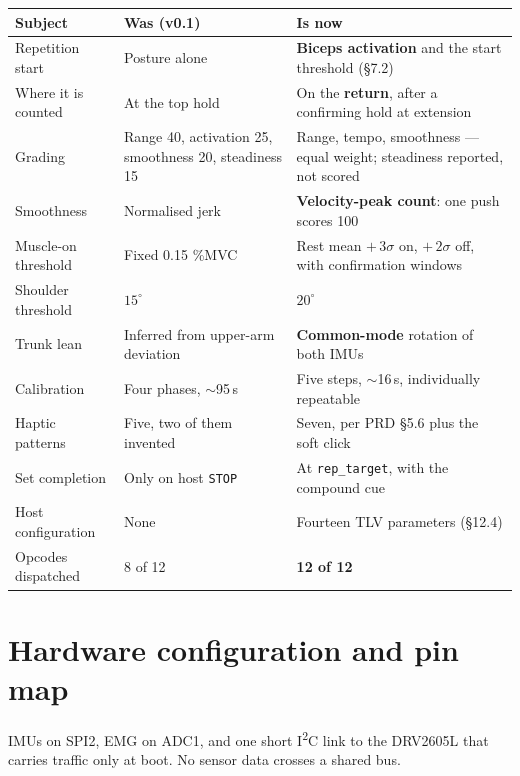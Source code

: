 \documentclass[11pt]{article}
\begin{document}
\begin{table}[H]
\centering\small
\begin{tabularx}{\linewidth}{@{}p{30mm} p{40mm} X@{}}
\toprule
\textbf{Subject} & \textbf{Was (v0.1)} & \textbf{Is now} \\
\midrule
Repetition start & Posture alone & \textbf{Biceps activation} and the start threshold (\S7.2) \\[3pt]
Where it is counted & At the top hold & On the \textbf{return}, after a confirming hold at extension \\[3pt]
Grading & Range 40, activation 25, smoothness 20, steadiness 15 & Range, tempo, smoothness --- equal weight; steadiness reported, not scored \\[3pt]
Smoothness & Normalised jerk & \textbf{Velocity-peak count}: one push scores 100 \\[3pt]
Muscle-on threshold & Fixed 0.15 \%MVC & Rest mean $+\,3\sigma$ on, $+\,2\sigma$ off, with confirmation windows \\[3pt]
Shoulder threshold & $15^{\circ}$ & $20^{\circ}$ \\[3pt]
Trunk lean & Inferred from upper-arm deviation & \textbf{Common-mode} rotation of both IMUs \\[3pt]
Calibration & Four phases, $\sim$95\,s & Five steps, $\sim$16\,s, individually repeatable \\[3pt]
Haptic patterns & Five, two of them invented & Seven, per PRD \S5.6 plus the soft click \\[3pt]
Set completion & Only on host \texttt{STOP} & At \texttt{rep\_target}, with the compound cue \\[3pt]
Host configuration & None & Fourteen TLV parameters (\S12.4) \\[3pt]
Opcodes dispatched & 8 of 12 & \textbf{12 of 12} \\
\bottomrule
\end{tabularx}
\end{table}

\section{Hardware configuration and pin map}

IMUs on SPI2, EMG on ADC1, and one short I\textsuperscript{2}C link to the
DRV2605L that carries traffic only at boot. No sensor data crosses a shared
bus.
\end{document}
